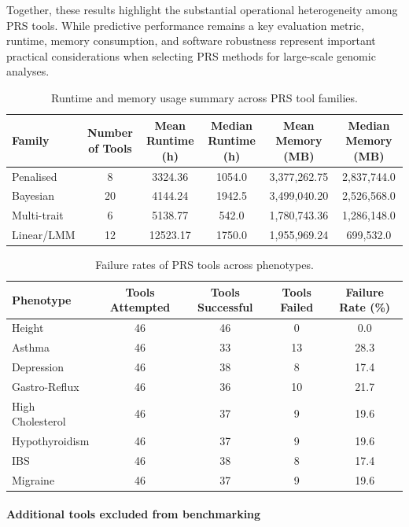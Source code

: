 \documentclass[pdflatex,sn-basic]{sn-jnl}
\begin{document}
Together, these results highlight the substantial operational heterogeneity among PRS tools. While predictive performance remains a key evaluation metric, runtime, memory consumption, and software robustness represent important practical considerations when selecting PRS methods for large-scale genomic analyses.
\begin{table}[ht]
\centering
\caption{Runtime and memory usage summary across PRS tool families.}
\label{tab:runtime_family_summary}
\begin{tabular}{lccccc}
\hline
Family & Number of Tools & Mean Runtime (h) & Median Runtime (h) & Mean Memory (MB) & Median Memory (MB) \\
\hline
Penalised & 8 & 3324.36 & 1054.0 & 3,377,262.75 & 2,837,744.0 \\
Bayesian & 20 & 4144.24 & 1942.5 & 3,499,040.20 & 2,526,568.0 \\
Multi-trait & 6 & 5138.77 & 542.0 & 1,780,743.36 & 1,286,148.0 \\
Linear/LMM & 12 & 12523.17 & 1750.0 & 1,955,969.24 & 699,532.0 \\
\hline
\end{tabular}
\end{table}

\begin{table}[ht]
\centering
\caption{Failure rates of PRS tools across phenotypes.}
\label{tab:failure_rate}
\begin{tabular}{lcccc}
\hline
Phenotype & Tools Attempted & Tools Successful & Tools Failed & Failure Rate (\%) \\
\hline
Height & 46 & 46 & 0 & 0.0 \\
Asthma & 46 & 33 & 13 & 28.3 \\
Depression & 46 & 38 & 8 & 17.4 \\
Gastro-Reflux & 46 & 36 & 10 & 21.7 \\
High Cholesterol & 46 & 37 & 9 & 19.6 \\
Hypothyroidism & 46 & 37 & 9 & 19.6 \\
IBS & 46 & 38 & 8 & 17.4 \\
Migraine & 46 & 37 & 9 & 19.6 \\
\hline
\end{tabular}
\end{table}
\paragraph{Additional tools excluded from benchmarking}
\end{document}
